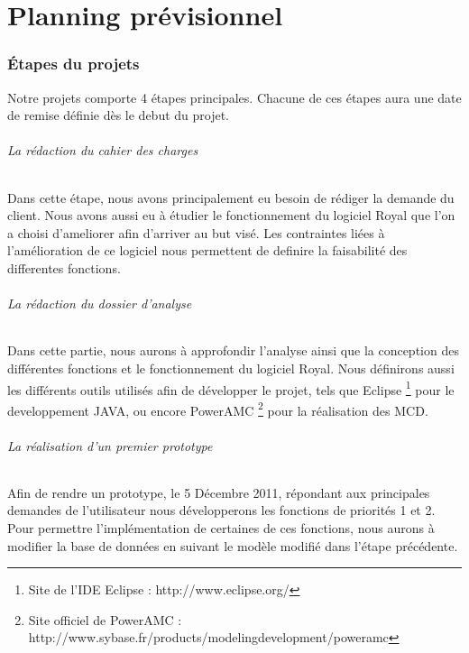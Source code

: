 \part{Planning prévisionnel}

\section{Étapes du projets}

Notre projets comporte 4 étapes principales. Chacune de ces étapes aura une date de remise définie dès le debut du projet. 

\paragraph{La rédaction du cahier des charges}

Dans cette étape, nous avons principalement eu besoin de rédiger la demande du client. 
Nous avons aussi eu à étudier le fonctionnement du logiciel Royal que l'on a choisi d'ameliorer afin d'arriver au but visé.
Les contraintes liées à l'amélioration de ce logiciel nous permettent de definire la faisabilité des differentes fonctions. 

\paragraph{La rédaction du dossier d'analyse}

Dans cette partie, nous aurons à approfondir l'analyse ainsi que la conception des différentes fonctions et le fonctionnement du logiciel Royal. 
Nous définirons aussi les différents outils utilisés afin de développer le projet, tels que 
Eclipse \footnote{Site de l'IDE Eclipse : http://www.eclipse.org/} 
pour le developpement JAVA, ou encore 
PowerAMC \footnote{Site officiel de PowerAMC : http://www.sybase.fr/products/modelingdevelopment/poweramc}
pour la réalisation des MCD.

\paragraph{La réalisation d'un premier prototype}

Afin de rendre un prototype, le 5 Décembre 2011, répondant aux principales demandes de l'utilisateur nous développerons les fonctions de priorités 1 et 2.
Pour permettre l'implémentation de certaines de ces fonctions, nous aurons à modifier la base de données en suivant le modèle modifié dans l'étape précédente.  

